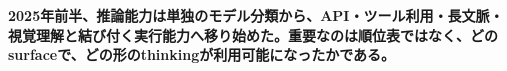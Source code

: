 \noindent\textbf{2025年前半、推論能力は単独のモデル分類から、API・ツール利用・長文脈・視覚理解と結び付く実行能力へ移り始めた。重要なのは順位表ではなく、どのsurfaceで、どの形のthinkingが利用可能になったかである。}\autocite{src-421ee9af3f80,src-650b567698aa,src-8f8555b73e1b}
